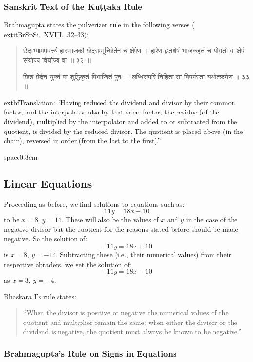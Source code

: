 \documentclass[11pt,a4paper]{article}
\newcommand{\dev}[1]{{\devanagarifont #1}}
\newenvironment{sanskritverse}{%
  \begin{quote}
  \devanagarifont
  \small
  \color{titlecolor}
}{\end{quote}}
\theoremstyle{definition}
\begin{document}
\subsubsection{Sanskrit Text of the Ku\d{t}\d{t}aka Rule}

Brahmagupta states the pulverizer rule in the following verses (	extit{BrSpSi}.\ XVIII.\ 32--33):

\begin{sanskritverse}
\dev{छेदाभ्यामपवर्त्त्य हारभाजकौ छेदसम्मूर्च्छितेन च क्षेपेण ।}
\dev{हारेण हृतशेषं भाजकहतं च योगतो वा क्षेपं संयोज्य वियोज्य वा ॥ ३२ ॥}

\dev{छिन्नं छेदेन युक्तं वा शुद्धिकृतं विभाजितं पुनः ।}
\dev{लब्धिरुपरि निहिता सा विपर्यस्ता यथोत्क्रमेण ॥ ३३ ॥}
\end{sanskritverse}

	extbf{Translation:} ``Having reduced the dividend and divisor by their common factor, and the interpolator also by that same factor; the residue (of the dividend), multiplied by the interpolator and added to or subtracted from the quotient, is divided by the reduced divisor. The quotient is placed above (in the chain), reversed in order (from the last to the first).''

space{0.3cm}

\subsection{Linear Equations}

Proceeding as before, we find solutions to equations such as:
\[
11y = 18x + 10
\]
to be $x = 8$, $y = 14$. These will also be the values of $x$ and $y$ in the case of the negative divisor but the quotient for the reasons stated before should be made negative. So the solution of:
\[
-11y = 18x + 10
\]
is $x = 8$, $y = -14$. Subtracting these (i.e., their numerical values) from their respective abraders, we get the solution of:
\[
-11y = 18x - 10
\]
as $x = 3$, $y = -4$.

Bh\=askara I's rule states:
\begin{quote}
``When the divisor is positive or negative the numerical values of the quotient and multiplier remain the same: when either the divisor or the dividend is negative, the quotient must always be known to be negative.''
\end{quote}

\subsubsection{Brahmagupta's Rule on Signs in Equations}
\end{document}
